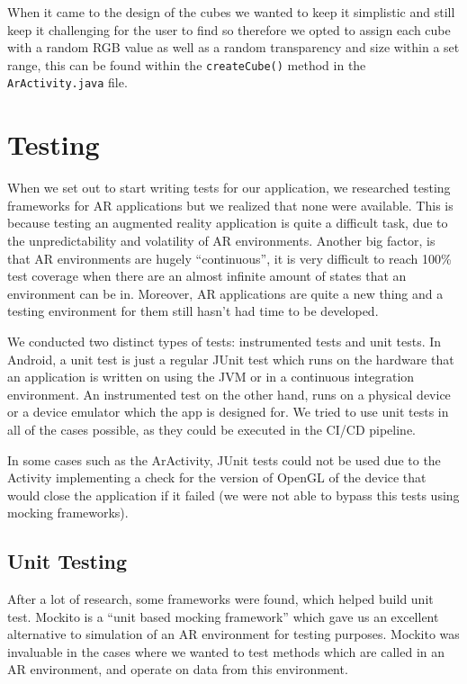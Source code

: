 \documentclass{l3proj}
\begin{document}
When it came to the design of the cubes we wanted to keep it simplistic and still keep it challenging for the user to find so therefore we opted to assign each cube with a random RGB value as well as a random transparency and size within a set range, this can be found within the \verb|createCube()| method in the \verb|ArActivity.java| file.

\section{Testing}
When we set out to start writing tests for our application, we researched testing 
frameworks for AR applications but we realized that none were available.
This is because testing an augmented reality application is quite a difficult task, 
due to the unpredictability and volatility of AR environments. 
Another big factor, is that AR environments are hugely “continuous”, it is 
very difficult to reach 100\% test coverage when there are an almost infinite 
amount of states that an environment can be in. Moreover, AR applications are
quite a new thing and a testing environment for them still hasn't had time to
be developed\cite{ArTesting}.

We conducted two distinct types of tests: instrumented tests and unit tests. 
In Android, a unit test is just a regular JUnit test which runs on the hardware that an application is 
written on using the JVM or in a continuous integration environment. 
An instrumented test on the other hand, runs on a physical device or a device 
emulator which the app is designed for\cite{AndroidTests}. We tried to use unit 
tests in all of the cases possible, as they could be executed in the CI/CD pipeline. 

In some cases such as the ArActivity, JUnit tests could not be used due to the Activity
implementing a check for the version of OpenGL of the device that would close the
application if it failed (we were not able to bypass this tests using mocking frameworks).

\subsection{Unit Testing}
After a lot of research, some frameworks were found, which helped build unit test.
Mockito is a “unit based mocking framework”\cite{Mockito} which gave us an excellent alternative 
to simulation of an AR environment for testing purposes. Mockito was invaluable in 
the cases where we wanted to test methods which are called in an AR environment, 
and operate on data from this environment.
\end{document}
